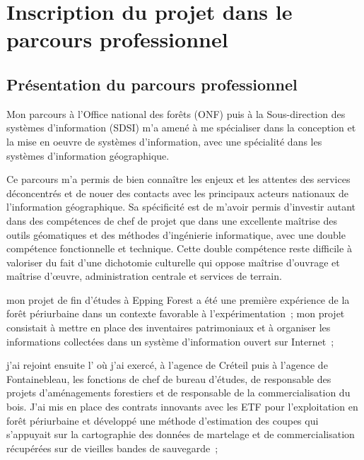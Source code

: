 \section
{Inscription du projet dans le parcours professionnel}

\subsection
{Présentation du parcours professionnel}

Mon parcours à l'Office national des forêts (ONF)
puis à la Sous-direction des systèmes d'information (SDSI)
m'a amené à me spécialiser dans la conception et la mise en oeuvre
de systèmes d'information, avec une spécialité dans les systèmes d'information géographique.

Ce parcours m'a permis de bien connaître les enjeux et les attentes
des services déconcentrés et de nouer des contacts avec les principaux
acteurs nationaux de l'information géographique.
Sa spécificité est de m'avoir permis d'investir autant dans
des compétences de chef de projet que dans une excellente maîtrise
des outils géomatiques et des méthodes d'ingénierie informatique,
avec une double compétence fonctionnelle
et technique.
Cette double compétence reste difficile à valoriser du fait d'une dichotomie
culturelle qui oppose maîtrise d'ouvrage et maîtrise d’œuvre,
administration centrale et services de terrain.

\startitemize[n]

\item mon projet de fin d'études à Epping Forest
      a été une première expérience de la forêt
      périurbaine dans un contexte favorable à l'expérimentation~;
      mon projet consistait à mettre en place des inventaires patrimoniaux
      et à organiser les informations collectées dans un système d'information
      ouvert sur Internet~;

\item j'ai rejoint ensuite l'{\ONF}
      où j'ai exercé, à l'agence de Créteil puis à l'agence de Fontainebleau,
      les fonctions de chef de bureau d'études, de responsable
      des projets d'aménagements forestiers et de responsable
      de la commercialisation du bois. J'ai mis en place
      des contrats innovants avec les ETF pour l'exploitation
      en forêt périurbaine et développé une méthode d'estimation
      des coupes qui s'appuyait sur la cartographie
      des données de martelage et de commercialisation
      récupérées sur de vieilles bandes de sauvegarde~;

